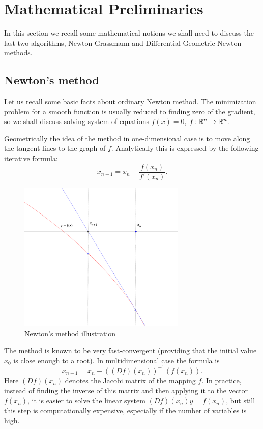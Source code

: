 \section{Mathematical Preliminaries}

In this section we recall some mathematical notions
we shall need to discuss the last two algorithms, 
Newton-Grassmann and Differential-Geometric Newton methods.

\subsection{Newton's method}

Let us recall some basic facts about ordinary Newton method. The minimization problem for 
a smooth function is usually reduced to finding zero of the gradient, 
so we shall discuss solving system of equations
$f(x) = 0$, $f \colon \mathbb{R}^n \to \mathbb{R}^n$.

 Geometrically the idea of the method in one-dimensional case is 
to move along the tangent lines to the graph of $f$. Analytically this is expressed by the following iterative formula:
\begin{equation}
 x_{n+1} = x_n - \frac{f(x_n) }{ f'(x_{n})}. 
\end{equation}


\begin{figure}
        \centering
                \includegraphics[width=8cm]{images/newton-image1.png}
        \caption{Newton's method illustration}
        \label{fig:hooi_hosvd_comparison}
\end{figure}
The method is known to be very fast-convergent (providing that the initial value $x_0$ is close enough to a root).
In multidimensional case the formula is
\begin{equation}
 x_{n+1} = x_n - ((Df)(x_n))^{-1} ( f(x_n) ).
\end{equation}
Here $(Df)(x_n)$ denotes the Jacobi matrix of the mapping $f$. In practice, instead of finding
the inverse of this matrix and then applying it to the vector $f(x_n)$, it is 
easier to solve the linear system $(Df)(x_n) y = f(x_n) $, but still this step is computationally expensive,
especially if the number of variables is high.


